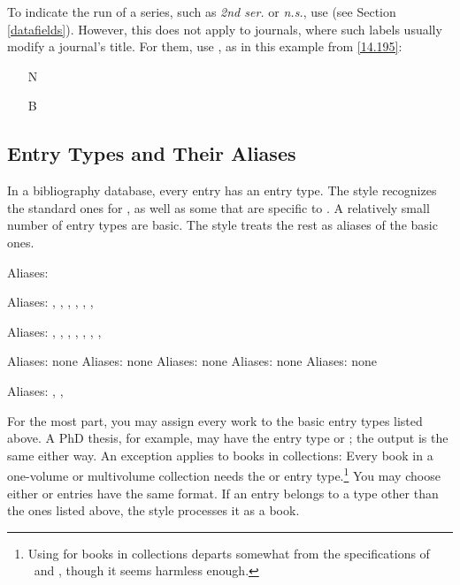 \documentclass[11pt,letterpaper,oneside]{article}
\begin{document}
To indicate the run of a series, such as \textit{2nd ser.} or
\textit{n.s.}, use  (see Section
\ref{datafields}). However, this does not apply to journals, where
such labels usually modify a journal's title. For them, use
, as in this example from \ref{14.195}:

\begin{itemize}
\item[N] 

\item[B] 
\end{itemize}

\subsection{Entry Types and Their Aliases}

In a bibliography database, every entry has an entry type. The style
recognizes the standard ones for \BibTeX, as well as some that are
specific to \biblatex. A relatively small number of entry types are
basic. The style treats the rest as aliases of the basic ones.

\begin{typelist}\raggedright


Aliases: 


Aliases: , , ,
, , ,


Aliases: , ,
, , ,
, , 

 Aliases: none
 Aliases: none
 Aliases: none
 Aliases: none
 Aliases: none


Aliases: , ,

\end{typelist}

\noindent For the most part, you may assign every work to the basic
entry types listed above. A PhD thesis, for example, may have the
entry type  or ; the output is the
same either way. An exception applies to books in collections: Every
book in a one-volume or multivolume collection needs the
 or  entry type.\footnote{Using
 for books in collections departs somewhat from the
specifications of \BibTeX\ and \biblatex, though it seems harmless
enough.} You may choose either  or
 entries have the same format. If an entry belongs
to a type other than the ones listed above, the style processes it as
a book.
\end{document}
